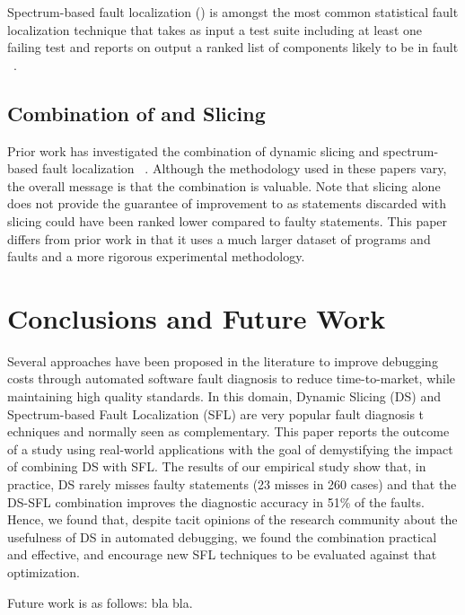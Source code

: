 \documentclass{article}
\begin{document}
Spectrum-based fault localization (\sfl{}) is amongst the most common statistical
fault localization technique that takes as input a test suite including at least
one failing test and reports on output a ranked list of components likely to be
in fault ~\cite{FLSurvey2016,DBLP:conf/kbse/JonesH05,DBLP:journals/smr/LuciaLJTB14,DBLP:journals/jss/AbreuZGG09}.

\subsection{Combination of \sfl{} and Slicing}

Prior work has investigated the combination of dynamic slicing and
spectrum-based fault
localization ~\cite{Wotawa:2010:FLB:1848650.1849235,Alves:2011:FUD:2190078.2190115,DBLP:conf/ecai/HoferW12,lei-mao-dai-wang-2012,slicing-sfl-repair}. Although
the methodology used in these papers vary, the overall message is that
the combination is valuable. Note that slicing alone does not provide
the guarantee of improvement to \sfl{} as statements discarded with
slicing could have been ranked lower compared to faulty
statements. This paper differs from prior work in that it uses a much
larger dataset of programs and faults and a more rigorous experimental
methodology.


\section{Conclusions and Future Work}
\label{sec:conc}
%

Several approaches have been proposed in the literature to improve debugging
costs through automated software fault diagnosis to reduce time-to-market,
while maintaining high quality standards. In this domain, Dynamic Slicing (DS)
and Spectrum-based Fault Localization (SFL) are very popular fault diagnosis t
echniques and normally seen as complementary. This paper reports the outcome of
a study using real-world applications with the goal of demystifying the impact
of combining DS with SFL. The results of our empirical study show that, in
practice, DS rarely misses faulty statements (23 misses in 260 cases) and that
the DS-SFL combination improves the diagnostic accuracy in 51\% of the faults.
Hence, we found that, despite tacit opinions of the research community about
the usefulness of DS in automated debugging, we found the combination practical
and effective, and encourage new SFL techniques to be evaluated against that
optimization.

Future work is as follows: bla bla.

%
{
  \small
  \balance
  
  
}
\end{document}
